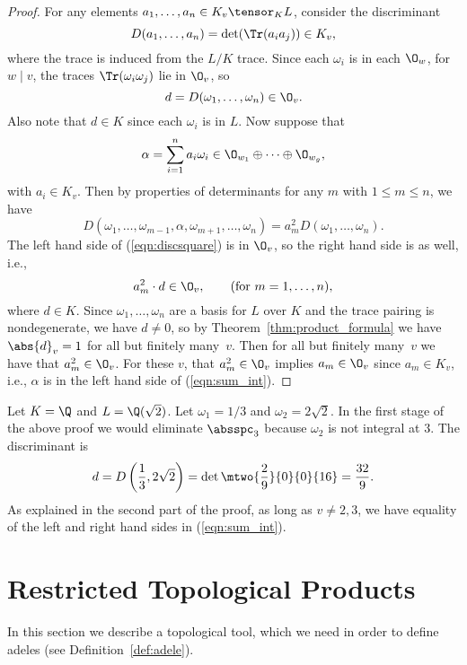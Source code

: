 \documentclass[11pt]{book}
\begin{document}
\begin{ch}
\begin{proof}
  For any elements $a_1,\ldots, a_n \in K_v\tensor_K L$, consider the
  discriminant
  $$
  D(a_1,\ldots, a_n) = \det(\Tr(a_i a_j)) \in K_v,
  $$
  where the trace is induced from the $L/K$ trace.
  Since each $\omega_i$ is in each $\O_w$, for $w\mid v$, the
  traces $\Tr(\omega_i \omega_j)$ lie in $\O_v$, so
  $$d = D(\omega_1,\ldots, \omega_n)\in \O_v.$$
  Also note that $d\in
  K$ since each $\omega_i$ is in $L$.  Now suppose that
  $$
  \alpha = \sum_{i=1}^n a_i \omega_i \in \O_{w_1} \oplus \cdots
  \oplus \O_{w_g},
  $$
  with $a_i \in K_v$.  Then by properties of determinants for any
  $m$ with $1\leq m\leq n$, we have
  \begin{equation}\label{eqn:discsquare}
  D(\omega_1,\ldots, \omega_{m-1}, \alpha, \omega_{m+1}, \ldots, \omega_n)
    = a_m^2 D(\omega_1,\ldots, \omega_n).
  \end{equation}
  The left hand side of (\ref{eqn:discsquare}) is in $\O_v$, so the
  right hand side is as well, i.e.,
  $$
  a_m^2 \cdot d \in \O_v, \qquad\text{(for }m=1,\ldots, n\text{)},
  $$
  where $d\in K$. Since $\omega_1,\ldots, \omega_n$ are a basis for
  $L$ over $K$ and the trace pairing is nondegenerate, we have $d\neq
  0$, so by Theorem~\ref{thm:product_formula} we have $\abs{d}_v=1$
  for all but finitely many~$v$.  Then for all but finitely many~$v$
  we have that $a_m^2\in \O_v$.  For these $v$, that $a_m^2\in\O_v$
  implies $a_m\in \O_v$ since $a_m\in K_v$, i.e., $\alpha$ is in the
  left hand side of (\ref{eqn:sum_int}).
\end{proof}
\begin{example}
Let $K=\Q$ and $L=\Q(\sqrt{2})$.  Let $\omega_1 = 1/3$ and $\omega_2 = 2\sqrt{2}$.  In the first stage of the above proof we would eliminate
$\absspc_3$ because $\omega_2$ is not integral at $3$.  The discriminant
is
$$
 d = D\left(\frac{1}{3}, 2\sqrt{2}\right)
   =\det \mtwo{\frac{2}{9}}{0}{0}{16} = \frac{32}{9}.
$$
As explained in the second part of the proof, as long as $v\neq 2, 3$,
we have equality of the left and right hand sides in (\ref{eqn:sum_int}).
\end{example}


\section{Restricted Topological Products}

In this section we describe a topological tool, which we need in order
to define adeles (see Definition~\ref{def:adele}).


\end{ch}
\end{document}
